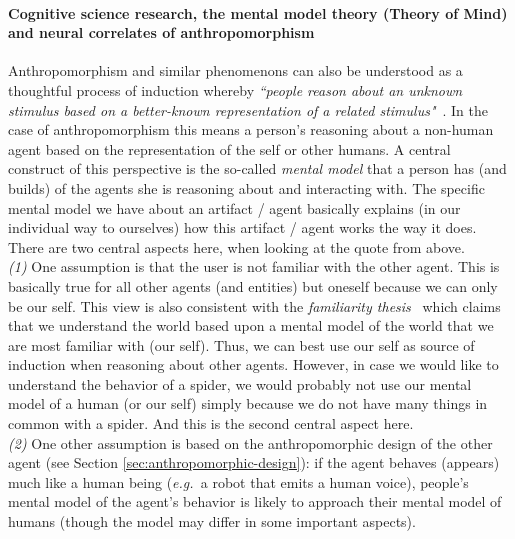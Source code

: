 \documentclass{frontiersSCNS} %
\newcommand{\eg}{{\textit{e.g.~}}}
\begin{document}
\paragraph{Cognitive science research, the mental model theory (Theory of Mind)
and neural correlates of anthropomorphism\\}

Anthropomorphism and similar phenomenons can also be understood as a thoughtful process of induction whereby \textit{``people reason about an unknown stimulus based on a better-known representation of a related stimulus"}~\citep{epley_when_2008}. In the case of anthropomorphism this means a person's reasoning about a non-human agent based on the representation of the self or other humans. A central construct of this perspective is the so-called \textit{mental model} that a person has (and builds) of the agents she is reasoning about and interacting with. The specific mental model we have about an artifact / agent basically explains (in our individual way to ourselves) how this artifact / agent works the way it does.
There are two central aspects here, when looking at the quote from \citep{epley_when_2008} above.\\
\textit{(1)} One assumption is that the user is not familiar with the other agent. This is basically true for all other agents (and entities) but oneself because we can only be our self. This view is also consistent with the \emph{familiarity thesis}~\citep{hegel_understanding_2008} which claims that we understand the world based upon a mental model of the world that we are most familiar with (our self). Thus, we can best use our self as source of induction when reasoning about other agents. However, in case we would like to understand the behavior of a spider, we would probably not use our mental model of a human (or our self) simply because we do not have many things in common with a spider. And this is the second central aspect here.\\
\textit{(2)} One other assumption is based on the anthropomorphic design of the other agent (see Section \ref{sec:anthropomorphic-design}): if the agent behaves (appears) much like a human being (\eg a robot that emits a human voice), people's mental model of the agent's behavior is likely to approach their mental model of humans (though the model may differ in some important aspects).
\end{document}
